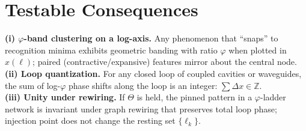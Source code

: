 \documentclass[11pt]{article}
\begin{document}
\section*{Testable Consequences}
\textbf{(i) $\varphi$-band clustering on a log-axis.} Any phenomenon that ``snaps'' to recognition minima exhibits geometric banding with ratio $\varphi$ when plotted in $x(\ell)$; paired (contractive/expansive) features mirror about the central node.\\
\textbf{(ii) Loop quantization.} For any closed loop of coupled cavities or waveguides, the sum of log-$\varphi$ phase shifts along the loop is an integer: $\sum \Delta x \in \mathbb{Z}$.\\
\textbf{(iii) Unity under rewiring.} If $\Theta$ is held, the pinned pattern in a $\varphi$-ladder network is invariant under graph rewiring that preserves total loop phase; injection point does not change the resting set $\{\ell_k\}$.
\end{document}
